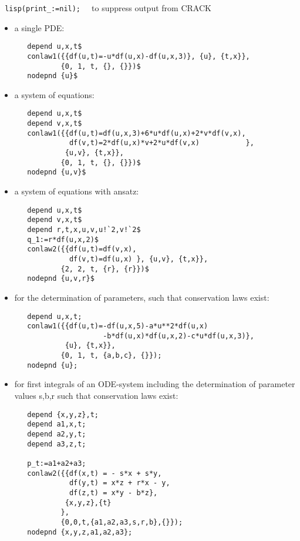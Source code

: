 \documentclass[12pt]{article}
\begin{document}
\verb+ lisp(print_:=nil);  +   to suppress output from CRACK
\begin{itemize}
\item a single PDE:
\begin{verbatim}
   depend u,x,t$
   conlaw1({{df(u,t)=-u*df(u,x)-df(u,x,3)}, {u}, {t,x}},
           {0, 1, t, {}, {}})$
   nodepnd {u}$
\end{verbatim}

\item a system of equations:
\begin{verbatim}
   depend u,x,t$
   depend v,x,t$
   conlaw1({{df(u,t)=df(u,x,3)+6*u*df(u,x)+2*v*df(v,x),
             df(v,t)=2*df(u,x)*v+2*u*df(v,x)           },
            {u,v}, {t,x}},
           {0, 1, t, {}, {}})$
   nodepnd {u,v}$
\end{verbatim}

\item a system of equations with ansatz:
\begin{verbatim}
   depend u,x,t$
   depend v,x,t$
   depend r,t,x,u,v,u!`2,v!`2$
   q_1:=r*df(u,x,2)$
   conlaw2({{df(u,t)=df(v,x),
             df(v,t)=df(u,x) }, {u,v}, {t,x}},
           {2, 2, t, {r}, {r}})$
   nodepnd {u,v,r}$
\end{verbatim}

\item for the
determination of parameters, such that conservation laws exist:
\begin{verbatim}
   depend u,x,t;
   conlaw1({{df(u,t)=-df(u,x,5)-a*u**2*df(u,x)
                     -b*df(u,x)*df(u,x,2)-c*u*df(u,x,3)},
            {u}, {t,x}},
           {0, 1, t, {a,b,c}, {}});
   nodepnd {u};
\end{verbatim}

\item for first integrals of an ODE-system including the determination of
parameter values s,b,r such that conservation laws exist:
\begin{verbatim}
   depend {x,y,z},t;
   depend a1,x,t;
   depend a2,y,t;
   depend a3,z,t;

   p_t:=a1+a2+a3;
   conlaw2({{df(x,t) = - s*x + s*y,
             df(y,t) = x*z + r*x - y,
             df(z,t) = x*y - b*z},
            {x,y,z},{t}
           },
           {0,0,t,{a1,a2,a3,s,r,b},{}});
   nodepnd {x,y,z,a1,a2,a3};
\end{verbatim}

\end{itemize}
\end{document}
